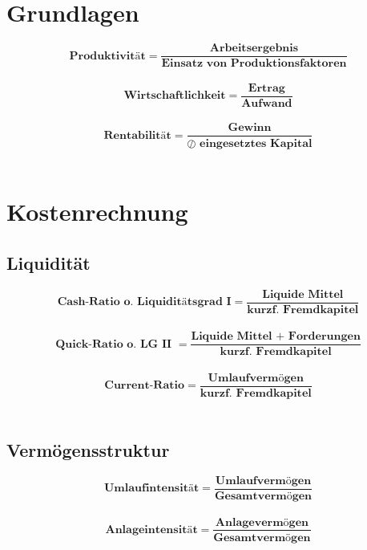 


\chapter{Grundlagen}
\[
	\textbf{Produktivität}=\frac{\textbf{Arbeitsergebnis}}{\textbf{Einsatz von Produktionsfaktoren}}
\]
\\
\[
	\textbf{Wirtschaftlichkeit}=\frac{\textbf{Ertrag}}{\textbf{Aufwand}}
\]
\\
\[
	\textbf{Rentabilität}=\frac{\textbf{Gewinn}}{\textbf{$\oslash$ eingesetztes Kapital}}
\]
\\
\chapter{Kostenrechnung}
\section{Liquidität}
\[
		\textbf{Cash-Ratio o. Liquiditätsgrad I}=\frac{\textbf{Liquide Mittel}}{\textbf{kurzf. Fremdkapitel}}
\]
\\
\[
	\textbf{Quick-Ratio o. LG II }=\frac{\textbf{Liquide Mittel + Forderungen}}{\textbf{kurzf. Fremdkapitel}}
\]
\\
\[
		\textbf{Current-Ratio}=\frac{\textbf{Umlaufvermögen}}{\textbf{kurzf. Fremdkapitel}}
\]
\\
\section{Vermögensstruktur}
\[
		\textbf{Umlaufintensität}=\frac{\textbf{Umlaufvermögen}}{\textbf{Gesamtvermögen}}
\]
\\
\[
		\textbf{Anlageintensität}=\frac{\textbf{Anlagevermögen}}{\textbf{Gesamtvermögen}}
\]
\\
